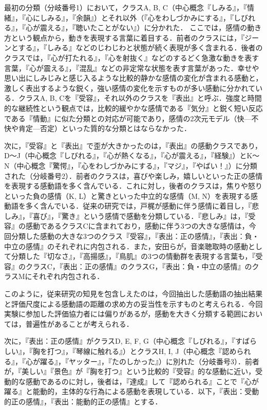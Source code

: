 \documentclass[japanese]{jnlp_1.3c}
\begin{document}
最初の分類（分岐番号1）において，クラスA, B, C（中心概念『しみる』，『情緒』，『心にしみる』，『余韻』）とそれ以外（『心をわしづかみにする』，『しびれる』，『心が震える』，『聴いたことがない』）に分かれた． ここでは，感情の動き方という観点から，動きを表現する言葉に着目する．前者のクラスには，『ジーンとする』，『しみる』などのじわじわと状態が続く表現が多く含まれる．後者のクラスでは，『心が打たれる』，『心を射抜く』などのするどく急激な動きを表す言葉，『心が震える』，『混乱』などの非定常な状態を表す言葉があった．幸せや思い出にしみじみと感じ入るような比較的静かな感情の変化が含まれる感動と，激しく表出するような鋭く，強い感情の変化を示すものが多い感動に分かれている．クラスA, B, Cを『受容』，それ以外のクラスを『表出』と呼ぶ．強度と時間的な継続性という観点では，比較的緩やかな感情である『気分』と鋭く短い反応である『情動』に似た分類との対応が可能であり，感情の2次元モデル（快—不快や肯定—否定）といった質的な分類とはならなかった．


次に，『受容』と『表出』で歪が大きかったのは，『表出』の感動クラスであり，D〜J（中心概念『しびれる』，『心が熱くなる』，『心が震える』，『経験』）とK〜N（中心概念『驚愕』，『心をわしづかみにする』，『マジ』，『やばい！』）に分類された（分岐番号2）．前者のクラスは，喜びや楽しみ，嬉しいといった正の感情を表現する感動語を多く含んでいる．これに対し，後者のクラスは，焦りや怒りといった負の感情（K, L）と驚きといった中立的な感情（M, N）を表現する感動語を多く含んでいる．従来の研究では，戸梶\cite{Article_006}が感動に伴う感情に着目し，『悲しみ』，『喜び』，『驚き』という感情で感動を分類している．『悲しみ』は，『受容』の感動であるクラスCに含まれており，感動に伴う3つの大きな感情は，今回分類した感動の大きな3つのクラス『受容』，『表出：正の感情』，『表出：負・中立の感情』のそれぞれに内包される．また，安田ら\cite{Inproc_205}が，音楽聴取時の感動として分類した『切なさ』，『高揚感』，『鳥肌』の3つの情動群を表現する言葉も，『受容』のクラスC，『表出：正の感情』のクラスG，『表出：負・中立の感情』のクラスMにそれぞれ内包される．


このように，従来研究の知見を包含しえたのは，今回抽出した感動語の抽出結果と評価尺度による感動語の距離の求め方の妥当性を示すものと考えられる．今回実験に参加した評価協力者には偏りがあるが，感動を大きく分類する範囲においては，普遍性があることが考えられる．


次に，『表出：正の感情』がクラスD, E, F, G（中心概念『しびれる』，『すばらしい』，『胸を打つ』，『琴線に触れる』）とクラスH, I, J（中心概念『認められる』，『心が躍る』，『ヤッター』，『たのしかった』）に別れた（分岐番号3）．前者が，『美しい』『景色』が『胸を打つ』という比較的『受容』的な感動に近い，受動的な感動であるのに対し，後者は，『達成』して『認められる』ことで『心が躍る』と能動的，主体的な行為による感動を表現している．以下，『表出：受動的正の感情』，『表出：能動的正の感情』とする．
\end{document}

